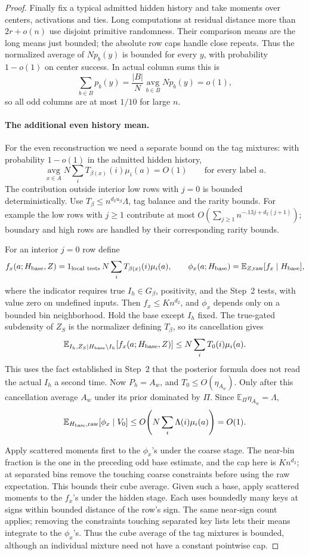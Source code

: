 \begin{proof}
Finally fix a typical admitted hidden history and take moments over
centers, activations and ties. Long computations at residual distance
more than \(2r+o(n)\) use disjoint primitive randomness. Their comparison
means are the long means just bounded; the absolute row caps handle close
repeats. Thus the normalized average of \(Np_b(y)\) is bounded for
every \(y\), with probability \(1-o(1)\) on center success. In actual
column sums this is
\[
 \sum_{b\in B}p_b(y)
 =\frac{|B|}{N}\operatorname*{avg}_{b\in B}Np_b(y)=o(1),
\]
so all odd columns are at most \(1/10\) for large \(n\).

\paragraph{The additional even history mean.}
For the even reconstruction we need a separate bound on the tag mixtures:
with probability \(1-o(1)\) in the admitted hidden history,
\[
 \operatorname*{avg}_{x\in A}N\sum_iT_{\beta(x)}(i)\mu_i(a)=O(1)
 \qquad\text{for every label }a.
\]
The contribution outside interior low rows with \(j=0\) is bounded
deterministically. Use \(T_\beta\le n^{d_2u_\beta}\Lambda\), tag
balance and the rarity bounds. For example the low rows with \(j\ge1\)
contribute at most
\(O(\sum_{j\ge1}n^{-.13j+d_2(j+1)})\); boundary and high rows are
handled by their corresponding rarity bounds.

For an interior \(j=0\) row define
\[
 f_x(a;H_{\rm base},Z)
 =1_{\rm local\ tests}\,N\sum_iT_{\beta(x)}(i)\mu_i(a),\qquad
 \phi_x(a;H_{\rm base})=\mathbb E_{Z,\rm raw}[f_x\mid H_{\rm base}],
\]
where the indicator requires true \(I_h\in G_\beta\), positivity,
and the Step~2 tests, with value zero on undefined inputs.
Then \(f_x\le K n^{d_2}\), and \(\phi_x\) depends only on a bounded
bin neighborhood. Hold the base except \(I_h\) fixed. The true-gated
subdensity of \(Z_S\) is the normalizer defining \(T_\beta\), so its
cancellation gives
\[
 \mathbb E_{I_h,Z_S\mid H_{\rm base}\setminus I_h}
       [f_x(a;H_{\rm base},Z)]
 \le N\sum_iT_0(i)\mu_i(a).
\]
This uses the fact established in Step~2 that the posterior formula does
not read the actual \(I_h\) a second time.
Now \(P_h=A_w\), and \(T_0\le O(\eta_{A_w})\).
Only after this cancellation average \(A_w\) under its prior dominated
by \(\Pi\). Since \(\mathbb E_\Pi\eta_{A_w}=\Lambda\),
\[
 \mathbb E_{H_{\rm base},\rm raw}[\phi_x\mid V_0]
 \le O\!\left(N\sum_i\Lambda(i)\mu_i(a)\right)=O(1).
\]

Apply scattered moments first to the \(\phi_x\)'s under the coarse
stage. The near-bin fraction is the one in the preceding odd
base estimate, and the cap here is \(K n^{d_2}\); at separated bins remove the touching coarse constraints
before using the raw expectation. This bounds their cube average.
Given such a base, apply scattered moments to the \(f_x\)'s under the
hidden stage. Each uses boundedly many keys at signs within bounded
distance of the row's sign. The same near-sign count applies; removing
the constraints touching separated key lists lets their means integrate
to the \(\phi_x\)'s. Thus the cube average of the tag mixtures is
bounded, although an individual mixture need not have a constant
pointwise cap.


\end{proof}
